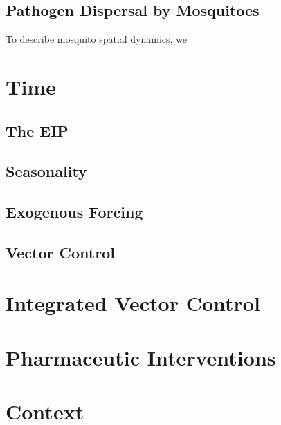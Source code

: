 \documentclass[
]{book}
\begin{document}
\hypertarget{pathogen-dispersal-by-mosquitoes}{%
\subsection{Pathogen Dispersal by Mosquitoes}\label{pathogen-dispersal-by-mosquitoes}}

To describe mosquito spatial dynamics, we

\hypertarget{time}{%
\section{Time}\label{time}}

\hypertarget{the-eip}{%
\subsection{The EIP}\label{the-eip}}

\hypertarget{seasonality}{%
\subsection{Seasonality}\label{seasonality}}

\hypertarget{exogenous-forcing-1}{%
\subsection{Exogenous Forcing}\label{exogenous-forcing-1}}

\hypertarget{vector-control}{%
\subsection{Vector Control}\label{vector-control}}

\hypertarget{integrated-vector-control}{%
\section{Integrated Vector Control}\label{integrated-vector-control}}

\hypertarget{pharmaceutic-interventions}{%
\section{Pharmaceutic Interventions}\label{pharmaceutic-interventions}}

\hypertarget{context}{%
\section{Context}\label{context}}
\end{document}
